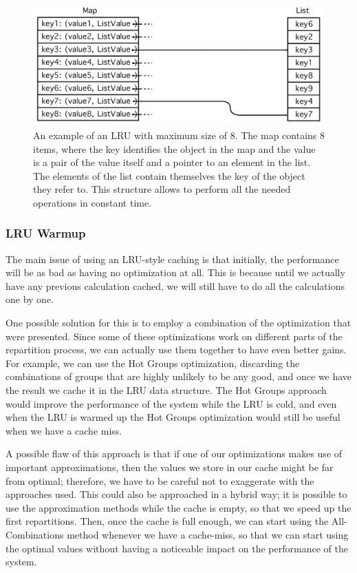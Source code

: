 \begin{figure}[!htb]
  \centering
  \includegraphics[width=\textwidth,height=\textheight,keepaspectratio]{img/lru.png}
  \caption[caption]{An example of an LRU with maximum size of 8. The map contains 8 items, where the key identifies the object in the map and the value is a pair of the value itself and a pointer to an element in the list. The elements of the list contain themselves the key of the object they refer to. This structure allows to perform all the needed operations in constant time. }
  \label{fig:lru}
\end{figure}

\subsubsection{LRU Warmup}\label{sec:warmup}
The main issue of using an LRU-style caching is that initially, the performance will be as bad as having no optimization at all. This is because until we actually have any previous calculation cached, we will still have to do all the calculations one by one. 

One possible solution for this is to employ a combination of the optimization that were presented. Since some of these optimizations work on different parts of the repartition process, we can actually use them together to have even better gains. For example, we can use the Hot Groups optimization, discarding the combinations of groups that are highly unlikely to be any good, and once we have the result we cache it in the LRU data structure. The Hot Groups approach would improve the performance of the system while the LRU is cold, and even when the LRU is warmed up the Hot Groups optimization would still be useful when we have a cache miss.

A possible flaw of this approach is that if one of our optimizations makes use of important approximations, then the values we store in our cache might be far from optimal; therefore, we have to be careful not to exaggerate with the approaches used. This could also be approached in a hybrid way; it is possible to use the approximation methods while the cache is empty, so that we speed up the first repartitions. Then, once the cache is full enough, we can start using the All-Combinations method whenever we have a cache-miss, so that we can start using the optimal values without having a noticeable impact on the performance of the system.

